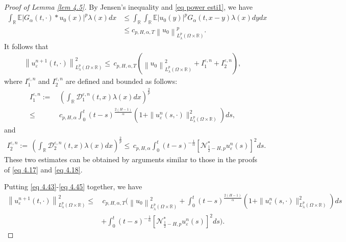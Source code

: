 \documentclass[11pt,reqno]{amsart}
\numberwithin{equation}{section}
\newcommand{\1}{{\bf 1}}
\newcommand{\2}{{\bf 2}}
\begin{document}
\begin{proof}[Proof of Lemma \ref{lem 4.5}]
By Jensen's inequality and \eqref{eq power esti1}, we have
\begin{align*}
\int_{\mathbb{R}}\mathbb{E}\left|G_{\alpha}(t,\cdot)*u_0(x)\right|^p\lambda(x)dx&\le \int_{\mathbb{R}}\int_{\mathbb{R}}\mathbb{E}|u_0(y)|^pG_{\alpha}(t,x-y)\lambda(x)dy dx\\
& \le c_{p,H,\alpha,T}\left\|u_0\right\|_{L^p_{\lambda}(\Omega\times\mathbb{R})}^p.
\end{align*}
 It follows that
  \begin{align}\label{eq 4.43}
\left\|u_{\varepsilon}^{n+1}(t,\cdot)\right\|^2_{L^p_{\lambda}(\Omega\times\mathbb{R})}
\le \, c_{p,H,\alpha,T}\left(\left\|u_0\right\|_{L^p_{\lambda}(\Omega\times\mathbb{R})}^2+ I_1^{\varepsilon,n}+I_2^{\varepsilon,n}\right),
\end{align}
where $I_1^{\varepsilon,n}$ and $I_2^{\varepsilon,n}$ are defined and bounded as follows:
\begin{equation}\label{eq 4.44}
\begin{split}
I_1^{\varepsilon,n}:=&\, \left(\int_{\mathbb{R}}\mathcal{D}_{1}^{\varepsilon,n}(t,x)\lambda(x)dx\right)^{\frac2{p}}\\
\le &\,  c_{p,H,\alpha}\int_0^t(t-s)^{\frac{2(H-1)}{\alpha}} \left(1+\|u_{\varepsilon}^n(s,\cdot)\|^2_{L^p_{\lambda}(\Omega\times\mathbb{R})}\right)ds,
\end{split}
\end{equation} and
\begin{equation}\label{eq 4.45}
\begin{split}
I_2^{\varepsilon,n}:=  \, \left(\int_{\mathbb{R}}\mathcal{D}_{2}^{\varepsilon,n}(t,x)\lambda(x)dx\right)^{\frac2{p}}  \le  \,  c_{p,H,\alpha}\int_0^t(t-s)^{-\frac{1}{\alpha}}\left[\mathcal{N}_{\frac12-H,p}^*u_{\varepsilon}^n(s)\right]^2ds.
\end{split}
\end{equation} 
These two estimates can be obtained by  arguments similar  to those in the proofs of \eqref{eq 4.17} and \eqref{eq 4.18}.

 Putting \eqref{eq 4.43}-\eqref{eq 4.45} together,  we have
\begin{equation}\label{eq 4.46}
\begin{split}
\left\|u_{\varepsilon}^{n+1}(t,\cdot)\right\|^2_{L^p_{\lambda}(\Omega\times\mathbb{R})}\le &\, c_{p,H,\alpha,T}\Bigg(\left\|u_0\right\|_{L^p_{\lambda}(\Omega\times\mathbb{R})}^2+\int_0^t(t-s)^{\frac{2(H-1)}{\alpha}} \left(1+\|u_{\varepsilon}^n(s,\cdot)\|^2_{L^p_{\lambda}(\Omega\times\mathbb{R})}\right)ds \\
&+\int_0^t(t-s)^{-\frac{1}{\alpha}}\left[\mathcal{N}_{\frac12-H,p}^*u_{\varepsilon}^n(s)\right]^2ds\Bigg).
\end{split}
\end{equation}


\end{proof}
\end{document}
